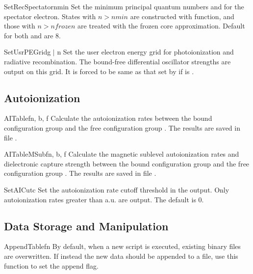 \begin{fundesc}{SetRecSpectator}{nmin}
Set the minimum principal quantum numbers  and  for the
spectator electron. States with $n > nmin$ are constructed with
 function, and those with $n > nfrozen$ are treated with the
frozen core approximation. Default for both  and  are 8.
\end{fundesc}

\begin{fundesc}{SetUsrPEGrid}{g $\mid$ n}
Set the user electron energy grid for photoionization and radiative
recombination. The bound-free differential oscillator strengths are output on
this grid. It is forced to be same as that set by  if
 is .
\end{fundesc}


\subsection{Autoionization}

\begin{fundesc}{AITable}{fn, b, f}
Calculate the autoionization rates between the bound configuration group
 and the free configuration group . The results are saved in
file .
\end{fundesc}

\begin{fundesc}{AITableMSub}{fn, b, f}
Calculate the magnetic sublevel autoionization rates and dielectronic capture
strength between the bound configuration group  and the free
configuration group . The results are saved in file .
\end{fundesc}

\begin{fundesc}{SetAICut}{c}
Set the autoionization rate cutoff threshold in the output. Only
autoionization rates greater than  a.u. are output. The default is 0.
\end{fundesc}


\subsection{Data Storage and Manipulation}

\begin{fundesc}{AppendTable}{fn}
By default, when a new script is executed, existing binary files are
overwritten. If instead the new data should be appended to a file, use
this function to set the append flag.
\end{fundesc}

